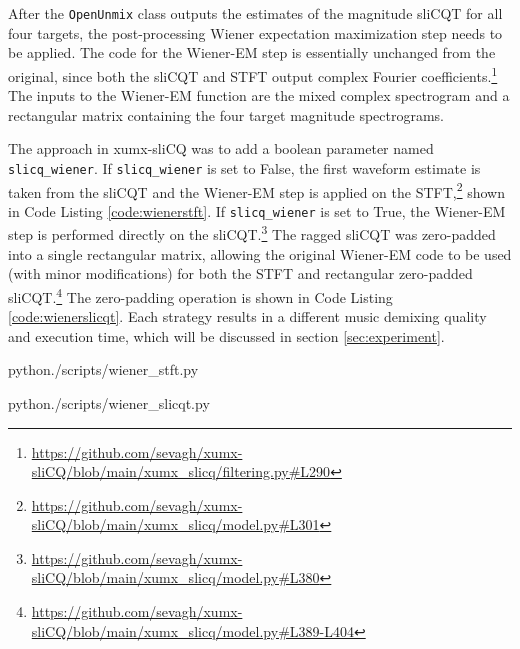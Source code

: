\documentclass[report.tex]{subfiles}
\begin{document}
After the \Verb#OpenUnmix# class outputs the estimates of the magnitude sliCQT for all four targets, the post-processing Wiener expectation maximization step needs to be applied. The code for the Wiener-EM step is essentially unchanged from the original, since both the sliCQT and STFT output complex Fourier coefficients.\footnote{\url{https://github.com/sevagh/xumx-sliCQ/blob/main/xumx_slicq/filtering.py\#L290}} The inputs to the Wiener-EM function are the mixed complex spectrogram and a rectangular matrix containing the four target magnitude spectrograms.

The approach in xumx-sliCQ was to add a boolean parameter named \Verb#slicq_wiener#. If \Verb#slicq_wiener# is set to False, the first waveform estimate is taken from the sliCQT and the Wiener-EM step is applied on the STFT,\footnote{\url{https://github.com/sevagh/xumx-sliCQ/blob/main/xumx_slicq/model.py\#L301}} shown in Code Listing \ref{code:wienerstft}. If \Verb#slicq_wiener# is set to True, the Wiener-EM step is performed directly on the sliCQT.\footnote{\url{https://github.com/sevagh/xumx-sliCQ/blob/main/xumx_slicq/model.py\#L380}} The ragged sliCQT was zero-padded into a single rectangular matrix, allowing the original Wiener-EM code to be used (with minor modifications) for both the STFT and rectangular zero-padded sliCQT.\footnote{\url{https://github.com/sevagh/xumx-sliCQ/blob/main/xumx_slicq/model.py\#L389-L404}} The zero-padding operation is shown in Code Listing \ref{code:wienerslicqt}. Each strategy results in a different music demixing quality and execution time, which will be discussed in section \ref{sec:experiment}. 

\begin{listing}[ht]
  \centering
\begin{inputminted}[linenos,breaklines,frame=single,fontsize=\scriptsize]{python}{./scripts/wiener_stft.py}
\end{inputminted}
  \caption{Using the STFT in the Wiener-EM post-processing step}
  \label{code:wienerstft}
\end{listing}

\begin{listing}[ht]
  \centering
\begin{inputminted}[linenos,breaklines,frame=single,fontsize=\scriptsize]{python}{./scripts/wiener_slicqt.py}
\end{inputminted}
  \caption{Zero-padding the sliCQT for the Wiener-EM post-processing step}
  \label{code:wienerslicqt}
\end{listing}
\end{document}

